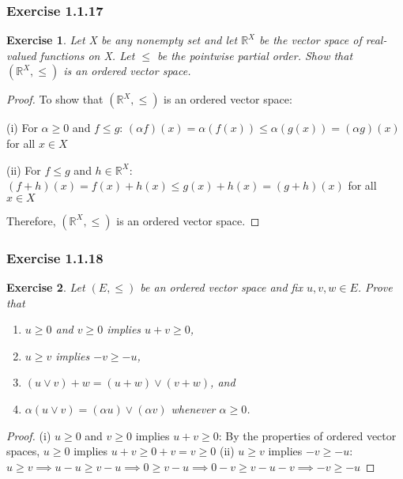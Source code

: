 \documentclass[11pt,xcolor={dvipsnames},hyperref={pdftex,pdfpagemode=UseNone,hidelinks,pdfdisplaydoctitle=true},usepdftitle=false]{beamer}
\newtheorem{exercise}{Exercise}[section]
\begin{document}
\begin{frame}
\frametitle{Exercise 1.1.17}
\begin{exercise}
Let X be any nonempty set and let $\mathbb{R}^X$ be the vector space of real-valued functions on X. Let $\leq$ be the pointwise partial order. Show that $(\mathbb{R}^X, \leq)$ is an ordered vector space.
\end{exercise}

\begin{proof}
To show that $(\mathbb{R}^X, \leq)$ is an ordered vector space:

(i) For $\alpha \geq 0$ and $f \leq g$:
   $(\alpha f)(x) = \alpha(f(x)) \leq \alpha(g(x)) = (\alpha g)(x)$ for all $x \in X$

(ii) For $f \leq g$ and $h \in \mathbb{R}^X$:
   $(f + h)(x) = f(x) + h(x) \leq g(x) + h(x) = (g + h)(x)$ for all $x \in X$

Therefore, $(\mathbb{R}^X, \leq)$ is an ordered vector space.
\end{proof}
\end{frame}

\begin{frame}
\frametitle{Exercise 1.1.18}

\begin{exercise}
Let $(E, \leq)$ be an ordered vector space and fix $u, v, w \in E$. Prove that
\begin{enumerate}
\item[(i)] $u \geq 0$ and $v \geq 0$ implies $u + v \geq 0$,
\item[(ii)] $u \geq v$ implies $-v \geq -u$,
\item[(iii)] $(u \vee v) + w = (u + w) \vee (v + w)$, and
\item[(iv)] $\alpha(u \vee v) = (\alpha u) \vee (\alpha v)$ whenever $\alpha \geq 0$.
\end{enumerate}
\end{exercise}

\begin{proof}
(i) $u \geq 0$ and $v \geq 0$ implies $u + v \geq 0$:
   By the properties of ordered vector spaces, $u \geq 0$ implies $u + v \geq 0 + v = v \geq 0$
(ii) $u \geq v$ implies $-v \geq -u$:
$u\ge v\implies u-u\ge v-u\implies 0\ge v-u\implies 0-v\ge v-u-v\implies -v\ge -u$
\end{proof}
\end{frame}
\end{document}
